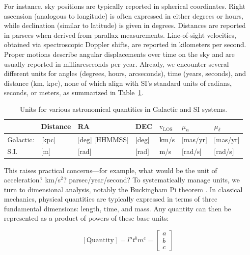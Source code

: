     For instance, sky positions are typically reported in spherical coordinates. Right ascension (analogous to longitude) is often expressed in either degrees or hours, while declination (similar to latitude) is given in degrees. Distances are reported in parsecs when derived from parallax measurements. Line-of-sight velocities, obtained via spectroscopic Doppler shifts, are reported in kilometers per second. Proper motions describe angular displacements over time on the sky  and are usually reported in milliarcseconds per year. Already, we encounter several different units for angles (degrees, hours, arcseconds), time (years, seconds), and distance (km, kpc), none of which align with SI’s standard units of radians, seconds, or meters, as summarized in Table~\ref{tab:units}.

    \begin{table}[]
        \caption{Units for various astronomical quantities in Galactic and SI systems.}
        \label{tab:units}
        \begin{tabular}{l|l|l|l|l|l|l|}
                            & Distance  & RA                     & DEC                    & \textbf{$\mathrm{v}_\mathrm{LOS}$} & $\mu_\alpha$ & $\mu_\delta$ \\ \hline
            Galactic: & {[}kpc{]} & {[}deg{]} {[}HHMMSS{]} & {[}deg{]}              & km/s                      & {[}mas/yr{]} & {[}mas/yr{]} \\ \hline
            S.I.       & {[}m{]}   & {[}rad{]}              & {[}rad{]}              & m/s                       & {[}rad/s{]}  & {[}rad/s{]}  \\ 
        \end{tabular}
    \end{table}

    This raises practical concerns—for example, what would be the unit of acceleration? km/s$^2$? parsec/year/second? To systematically manage units, we turn to dimensional analysis, notably the Buckingham Pi theorem \parencite{1914PhRv....4..345B}. In classical mechanics, physical quantities are typically expressed in terms of three fundamental dimensions: length, time, and mass. Any quantity can then be represented as a product of powers of these base units:

    \begin{equation}
        \left[\mathrm{Quantity}\right] = l^a t^b m^c =
            \begin{bmatrix}
                a\\
                b\\
                c 
            \end{bmatrix}
    \end{equation}

